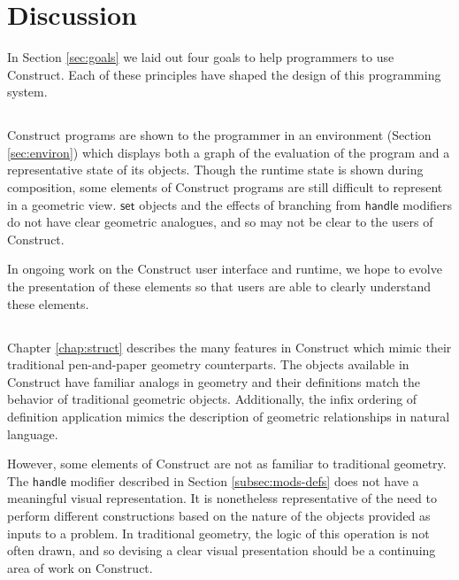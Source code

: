 \documentclass[twoside,openright,11pt]{report}
\begin{document}
\section{Discussion}
\label{sec:discuss}

In Section \ref{sec:goals} we laid out four goals to help programmers to use Construct. Each of these principles have shaped the design of this programming system.

\subsection{\constructgoalsclear}

Construct programs are shown to the programmer in an environment (Section \ref{sec:environ}) which displays both a graph of the evaluation of the program and a representative state of its objects.
Though the runtime state is shown during composition, some elements of Construct programs are still difficult to represent in a geometric view. 
$\mathsf{set}$ objects and the effects of branching from $\mathsf{handle}$ modifiers do not have clear geometric analogues, and so may not be clear to the users of Construct.

In ongoing work on the Construct user interface and runtime, we hope to evolve the presentation of these elements so that users are able to clearly understand these elements.

\subsection{\constructgoalsnative}

Chapter \ref{chap:struct} describes the many features in Construct which mimic their traditional pen-and-paper geometry counterparts.
The objects available in Construct have familiar analogs in geometry and their definitions match the behavior of traditional geometric objects. 
Additionally, the infix ordering of definition application mimics the description of geometric relationships in natural language.

However, some elements of Construct are not as familiar to traditional geometry. 
The $\mathsf{handle}$ modifier described in Section \ref{subsec:mods-defs} does not have a meaningful visual representation.
It is nonetheless representative of the need to perform different constructions based on the nature of the objects provided as inputs to a problem. 
In traditional geometry, the logic of this operation is not often drawn, and so devising a clear visual presentation should be a continuing area of work on Construct.
\end{document}
